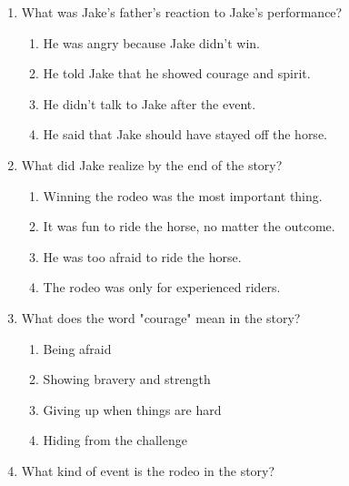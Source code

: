 \documentclass[12pt]{article}
\begin{document}
\begin{enumerate}
    \vspace{0.5cm}

    \item What was Jake's father's reaction to Jake's performance?

    \begin{enumerate}[label=\Alph*.]
        \item He was angry because Jake didn’t win.
        \item He told Jake that he showed courage and spirit.
        \item He didn’t talk to Jake after the event.
        \item He said that Jake should have stayed off the horse.
    \end{enumerate}

    \vspace{0.5cm}

    \item What did Jake realize by the end of the story?

    \begin{enumerate}[label=\Alph*.]
        \item Winning the rodeo was the most important thing.
        \item It was fun to ride the horse, no matter the outcome.
        \item He was too afraid to ride the horse.
        \item The rodeo was only for experienced riders.
    \end{enumerate}

    \vspace{0.5cm}

    \item What does the word "courage" mean in the story?

    \begin{enumerate}[label=\Alph*.]
        \item Being afraid
        \item Showing bravery and strength
        \item Giving up when things are hard
        \item Hiding from the challenge
    \end{enumerate}

    \vspace{0.5cm}

    \item What kind of event is the rodeo in the story?


\end{enumerate}
\end{document}
